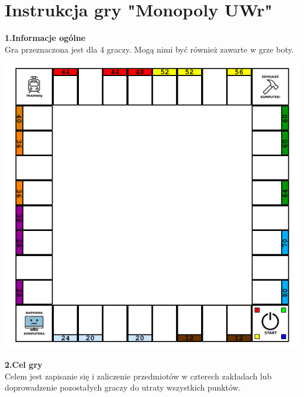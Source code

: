 \documentclass[a4paper]{article}
\author{}
\title{}
\date{\today}
\begin{document}
\section*{Instrukcja gry "Monopoly UWr"}

\noindent \textbf{1.Informacje ogólne}\\
\noindent Gra przeznaczona jest dla 4 graczy. Mogą nimi być również zawarte w grze boty.
\vspace{10pt}

\includegraphics[scale=0.8]{board.png}

\noindent \textbf{2.Cel gry}\\
\noindent Celem jest zapisanie się i zaliczenie przedmiotów w czterech zakładach lub doprowadzenie pozostałych graczy do utraty wszystkich punktów.
\vspace{10pt}
\end{document}
